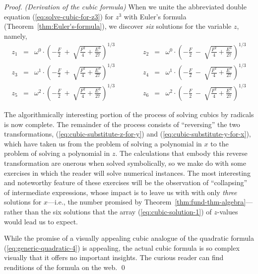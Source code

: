 \begin{proof} {\it (Derivation of the cubic formula)}
When we unite the abbreviated double equation (\ref{eq:solve-cubic-for-z3}) for $z^3$ with Euler's formula (Theorem~\ref{thm:Euler's-formula}), we discover {\em six} solutions for the variable $z$, namely, {\small
\begin{equation}
\label{eq:cubic-solution-1}
\begin{array}{ccrrrrrccr}
z_1 & = &
{\displaystyle
\omega^0 \cdot
\left( -\frac{F}{2} \ + \ \sqrt{\frac{F^2}{4} + \frac{E^3}{27}}
\right)^{1/3} 
}
  & & & & &
z_2 & = &
{\displaystyle
\omega^0 \cdot
\left( -\frac{F}{2} \ - \ \sqrt{\frac{F^2}{4} + \frac{E^3}{27}}
\right)^{1/3}
} \\
z_3 & = &
{\displaystyle
\omega^1 \cdot
\left( -\frac{F}{2} \ + \ \sqrt{\frac{F^2}{4} + \frac{E^3}{27}}
\right)^{1/3}
}
  & & & & & 
z_4 & = &
{\displaystyle
\omega^1 \cdot
\left( -\frac{F}{2} \ - \ \sqrt{\frac{F^2}{4} + \frac{E^3}{27}}
\right)^{1/3}
} \\
z_5 & = &
{\displaystyle
\omega^2 \cdot
\left( -\frac{F}{2} \ + \ \sqrt{\frac{F^2}{4} + \frac{E^3}{27}}
\right)^{1/3}
}
  & & & & &
z_6 & = &
{\displaystyle
\omega^2 \cdot
\left( -\frac{F}{2} \ - \ \sqrt{\frac{F^2}{4} + \frac{E^3}{27}}
\right)^{1/3}
}
\end{array}
\end{equation}
}

\smallskip

The algorithmically interesting portion of the process of solving cubics by radicals is now complete.  The remainder of the process consists of ``reversing'' the two transformations,
(\ref{eq:cubic-substitute-z-for-y}) and (\ref{eq:cubic-substitute-y-for-x}), which have taken us from the problem of solving a polynomial in $x$ to the problem of solving a polynomial in $z$.  The calculations that embody this reverse transformation are onerous when solved symbolically, so we make do with some exercises in which the reader will solve numerical instances.  The most interesting and noteworthy feature of these exercises will be the observation of ``collapsing'' of intermediate expressions, whose impact is to leave us with with only {\em three} solutions for $x$---i.e., the number promised by Theorem~\ref{thm:fund-thm-algebra}---rather than the six solutions that the array (\ref{eq:cubic-solution-1}) of $z$-values would lead us to expect.

\smallskip

While the promise of a visually appealing cubic analogue of the quadratic formula (\ref{eq:generic-quadratic-4}) is appealing, the actual cubic formula is so complex visually that it offers no important insights.  The curious reader can find renditions of the formula on the web. \qed
\end{proof}

